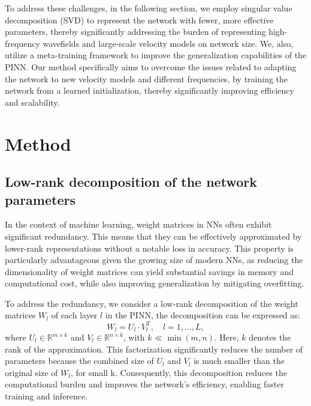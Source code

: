 To address these challenges, in the following section, we employ singular value decomposition (SVD) to represent the network with fewer, more effective parameters, thereby significantly addressing the burden of representing high-frequency wavefields and large-scale velocity models on network size. We, also, utilize a meta-training framework to improve the generalization capabilities of the PINN. Our method specifically aims to overcome the issues related to adapting the network to new velocity models and different frequencies, by training the network from a learned initialization, thereby significantly improving efficiency and scalability. 

\section{\textbf{Method}}\label{method}
\subsection{Low-rank decomposition of the network parameters}
In the context of machine learning, weight matrices in NNs often exhibit significant redundancy. This means that they can be effectively approximated by lower-rank representations without a notable loss in accuracy. This property is particularly advantageous given the growing size of modern NNs, as reducing the dimensionality of weight matrices can yield substantial savings in memory and computational cost, while also improving generalization by mitigating overfitting. 

To address the redundancy, we consider a low-rank decomposition of the weight matrices $W_l$ of each layer $l$ in the PINN, the decomposition can be expressed as:
\begin{equation}\label{eq7}
W_l = U_l \cdot V_l^\text{T}, \quad l = 1, \ldots, L,
\end{equation}
where $U_l \in \mathbb{R}^{m \times k}$ and $V_l \in \mathbb{R}^{n \times k}$, with $k \ll \min(m, n)$. Here, $k$ denotes the rank of the approximation. This factorization significantly reduces the number of parameters because the combined size of $U_l$ and $V_l$ is much smaller than the original size of $W_l$, for small k. Consequently, this decomposition reduces the computational burden and improves the network’s efficiency, enabling faster training and inference. 

